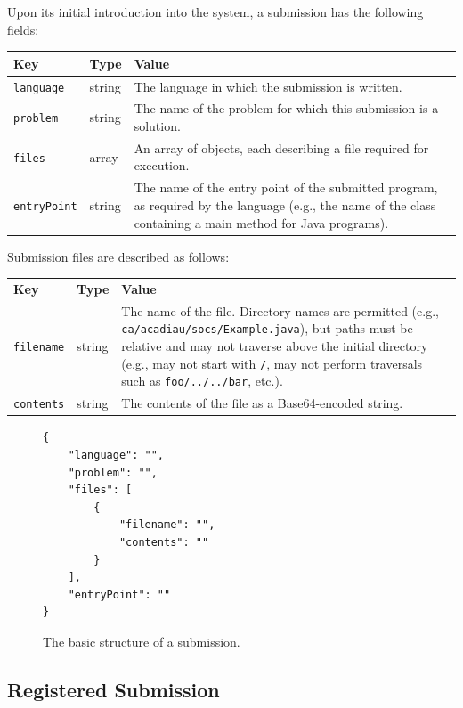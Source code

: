 \documentclass[11pt,letterpaper]{article}
\begin{document}
Upon its initial introduction into the system, a submission has the following
fields:

\nopagebreak
\begin{tabulary}{\textwidth}{ | l | l | L | }
    \hline
    \textbf{Key} & \textbf{Type} & \textbf{Value} \\
    \hline
    \texttt{language} & string & The language in which the submission is
        written. \\
    \hline
    \texttt{problem} & string & The name of the problem for which this
        submission is a solution. \\
    \hline
    \texttt{files} & array & An array of objects, each describing a file
        required for execution. \\
    \hline
    \texttt{entryPoint} & string & The name of the entry point of the submitted
        program, as required by the language (e.g., the name of the class
        containing a main method for Java programs). \\
    \hline
\end{tabulary}

Submission files are described as follows:

\nopagebreak
\begin{tabulary}{\textwidth}{ | l | l | L | }
    \hline
    \textbf{Key} & \textbf{Type} & \textbf{Value} \\
    \texttt{filename} & string & The name of the file. Directory names are
        permitted (e.g., \texttt{ca/acadiau/socs/Example.java}), but paths must
        be relative and may not traverse above the initial directory (e.g., may
        not start with \texttt{/}, may not perform traversals such as
        \texttt{foo/../../bar}, etc.). \\
    \hline
    \texttt{contents} & string & The contents of the file as a Base64-encoded
        string. \\
    \hline
\end{tabulary}

\begin{figure}
\begin{lstlisting}
{
    "language": "",
    "problem": "",
    "files": [
        {
            "filename": "",
            "contents": ""
        }
    ],
    "entryPoint": ""
}
\end{lstlisting}
\caption{The basic structure of a submission.}
\label{formats-sub-listing}
\end{figure}

\subsection{Registered Submission}
\label{formats-reg-sub}
\end{document}

